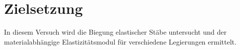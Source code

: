 \section{Zielsetzung}


\label{sec:Zielsetzung}

In diesem Versuch wird die Biegung elastischer Stäbe untersucht und
der materialabhängige Elastizitätsmodul für verschiedene Legierungen ermittelt. 
